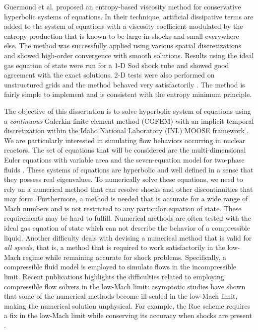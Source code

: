 Guermond et al. \cite{jlg1, jlg2, jlg3} proposed an entropy-based viscosity method for conservative hyperbolic systems of equations. In their technique, artificial dissipative terms are added to the system of equations with a viscosity coefficient modulated by the entropy production that is known to be large in shocks and small everywhere else. The method was successfully applied using various spatial discretizations \cite{jlg2, jlg3, valentin} and showed high-order convergence with smooth solutions. Results using the ideal gas equation of state were run for a 1-D Sod shock tube and showed good agreement with the exact solutions. 2-D tests were also performed on unstructured grids and the method behaved very satisfactorily \cite{jlg1,valentin}. The method is fairly simple to implement and is consistent with the entropy minimum principle.


The objective of this dissertation is to solve hyperbolic system of equations using a \emph{continuous} Galerkin finite element method (CGFEM) with an implicit temporal discretization within the Idaho National Laboratory (INL) MOOSE framework \cite{Moose}. We are particularly interested in simulating flow behaviors occurring in nuclear reactors. The set of equations that will be considered are the multi-dimensional Euler equations with variable area \cite{Toro} and the seven-equation model for two-phase fluids \cite{SEM}. These systems of equations are hyperbolic and well defined in a sense that they possess real eigenvalues. To numerically solve these equations, we need to rely on a numerical method that can resolve shocks and other discontinuities that may form. Furthermore, a method is needed that is accurate for a wide range of Mach numbers and is not restricted to any particular equation of state. These requirements may be hard to fulfill. Numerical methods are often tested with the ideal gas equation of state which can not describe the behavior of a compressible liquid. Another difficulty deals with devising a numerical method that is valid for \emph{all speeds}, that is, a method that is required to work  satisfactorily in the low-Mach regime while remaining accurate for shock problems. Specifically, a compressible fluid model is employed to simulate flows in the incompressible limit. Recent publications \cite{LowMach1, LowMach2} highlights the difficulties related to employing compressible flow solvers in the low-Mach limit: asymptotic studies have shown that some of the numerical methods become ill-scaled in the low-Mach limit, making the numerical solution unphysical. For example, the Roe scheme requires a fix in the low-Mach limit while conserving its accuracy when shocks are present \cite{Roe}. 


